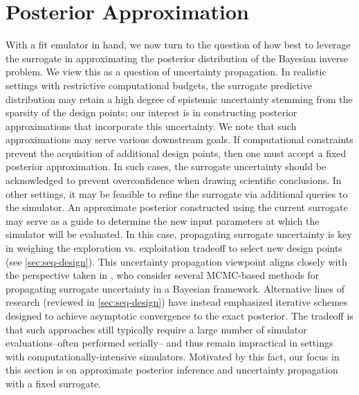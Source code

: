\documentclass[12pt]{article}
\begin{document}
\section{Posterior Approximation} \label{sec:post-approx}
With a fit emulator in hand, we now turn to the question of how best to leverage the surrogate in approximating the 
posterior distribution of the Bayesian inverse problem. We view this as a question of uncertainty propagation. 
In realistic settings with restrictive computational budgets, the surrogate predictive distribution may retain a high degree of 
epistemic uncertainty stemming from the sparsity of the design points; our interest is in constructing posterior 
approximations that incorporate this uncertainty. We note that such approximations 
may serve various downstream goals. If computational constraints prevent the acquisition of additional 
design points, then one must accept a fixed posterior approximation.
In such cases, the surrogate uncertainty should be acknowledged to prevent 
overconfidence when drawing scientific conclusions. In other settings, it may be feasible to refine the surrogate 
via additional queries to the simulator. An approximate posterior constructed using the current 
surrogate may serve as a guide to determine the new input parameters at which the simulator will be 
evaluated. In this case, propagating surrogate uncertainty is key in weighing the exploration vs. exploitation 
tradeoff to select new design points (see \cref{sec:seq-design}).
This uncertainty propagation viewpoint aligns closely with the perspective taken in \citep{BurknerSurrogate}, 
who consider several MCMC-based methods for propagating surrogate uncertainty in a Bayesian framework. 
Alternative lines of research (reviewed in \cref{sec:seq-design}) have instead emphasized iterative schemes 
designed to achieve asymptotic convergence to the exact posterior. The tradeoff is that such approaches 
still typically require a large number of simulator evaluations--often performed serially-- and thus remain 
impractical in settings with computationally-intensive simulators.
Motivated by this fact, our focus in this section is on approximate posterior inference and uncertainty propagation
with a fixed surrogate.
\end{document}
